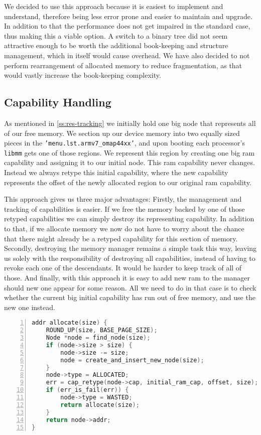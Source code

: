 We decided to use this approach because it is easiest to implement and 
understand, therefore being less error prone and easier to maintain and 
upgrade. In addition to that the performance does not get impaired in the 
standard case, thus making this a viable option. A switch to a binary tree did 
not seem attractive enough to be worth the additional book-keeping and 
structure management, which in itself would cause overhead. We have also 
decided to not perform rearrangement of allocated memory to reduce 
fragmentation, as that would vastly increase the book-keeping complexity.

\subsection{Capability Handling}\label{ss:cap-handling}

As mentioned in \autoref{ss:res-tracking} we initially hold one big node that 
represents all of our free memory. We section up our device memory into two 
equally sized pieces in the \texttt{'menu.lst.armv7\_omap44xx'}, and upon 
booting each processor's \texttt{libmm} gets one of those regions. We 
represent this region by creating one big ram capability and assigning it to 
our initial node. This ram capability never changes. Instead we always retype 
this initial capability, where the new capability represents the offset of the 
newly allocated region to our original ram capability.
\medskip

This approach gives us three major advantages: Firstly, the management and 
tracking of capabilities is easier. If we free the memory backed by one of 
those retyped capabilities we can simply destroy its representing capability. 
In addition to that, if we allocate memory we now do not have to worry about 
the chance that there might already be a retyped capability for this section of 
memory. Secondly, destroying the memory manager remains a simple task this way, 
leaving us solely with the responsibility of destroying all capabilities, 
instead of having to revoke each one of the descendants. It would be harder to 
keep track of all of those. And finally, with this approach it is easy to add 
new ram to the manager should new one appear for some reason. All we need to do 
in that case is to check whether the current big initial capability has run out 
of free memory, and use the new one instead.

\begin{lstlisting}[caption={Allocation Procedure (Pseudocode)}, 
label=lst:allocation, numbers=left, stepnumber=1, float, floatplacement=tl, 
frame=tb, language=c]
addr allocate(size) {
    ROUND_UP(size, BASE_PAGE_SIZE);
    Node *node = find_node(size);
    if (node->size > size) {
        node->size -= size;
        node = create_and_insert_new_node(size);
    }
    node->type = ALLOCATED;
    err = cap_retype(node->cap, initial_ram_cap, offset, size);
    if (err_is_fail(err)) {
        node->type = WASTED;
        return allocate(size);
    }
    return node->addr;
}
\end{lstlisting}

